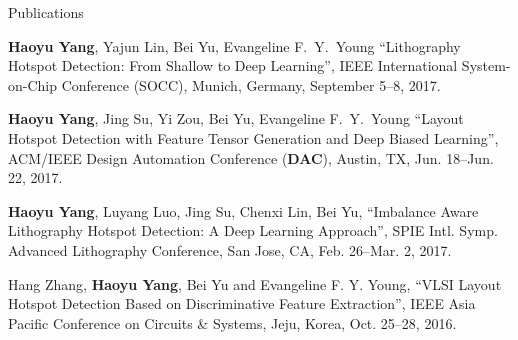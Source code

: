 \begin{rSection}{Publications}
\begin{description}[font=\normalfont]
{	}	
	\item[{[C4]}]{
		\textbf{Haoyu Yang}, Yajun Lin, Bei Yu, Evangeline F.~Y.~Young
		``Lithography Hotspot Detection: From Shallow to Deep Learning'',
		IEEE International System-on-Chip Conference (SOCC), Munich, Germany, September 5--8, 2017. 
	}
	\item[{[C3]}]{
		\textbf{Haoyu Yang}, Jing Su, Yi Zou, Bei Yu, Evangeline F.~Y.~Young
		``Layout Hotspot Detection with Feature Tensor Generation and Deep Biased Learning'',
		ACM/IEEE Design Automation Conference (\textbf{DAC}), Austin, TX, Jun. 18--Jun. 22, 2017. 
	}
	\item[{[C2]}]{
		\textbf{Haoyu Yang}, Luyang Luo, Jing Su, Chenxi Lin, Bei Yu,
		``Imbalance Aware Lithography Hotspot Detection: A Deep Learning Approach'',
		SPIE Intl. Symp. Advanced Lithography Conference, San Jose, CA, Feb. 26--Mar. 2, 2017. 
	}
	\item[{[C1]}]{
		Hang Zhang, \textbf{Haoyu Yang}, Bei Yu and Evangeline F. Y. Young,
		``VLSI Layout Hotspot Detection Based on Discriminative Feature Extraction'',
		IEEE Asia Pacific Conference on Circuits \& Systems, Jeju, Korea, Oct. 25--28, 2016.
	}
\end{description}



\fi




\end{rSection}


